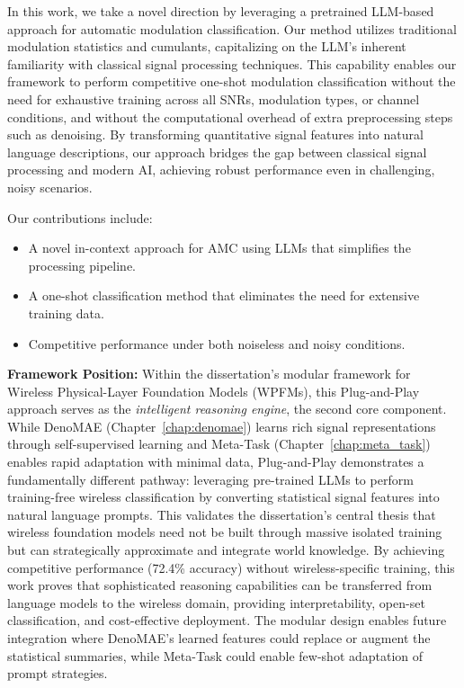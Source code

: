 In this work, we take a novel direction by leveraging a pretrained LLM-based approach for automatic modulation classification. Our method utilizes traditional modulation statistics and cumulants, capitalizing on the LLM’s inherent familiarity with classical signal processing techniques. This capability enables our framework to perform competitive one-shot modulation classification without the need for exhaustive training across all SNRs, modulation types, or channel conditions, and without the computational overhead of extra preprocessing steps such as denoising. By transforming quantitative signal features into natural language descriptions, our approach bridges the gap between classical signal processing and modern AI, achieving robust performance even in challenging, noisy scenarios.

Our contributions include:
\begin{itemize}
    \item A novel in-context approach for AMC using LLMs that simplifies the processing pipeline.
    \item A one-shot classification method that eliminates the need for extensive training data.
    \item Competitive performance under both noiseless and noisy conditions.
\end{itemize}

\textbf{Framework Position:} Within the dissertation's modular framework for Wireless Physical-Layer Foundation Models (WPFMs), this Plug-and-Play approach serves as the \textit{intelligent reasoning engine}, the second core component. While DenoMAE (Chapter~\ref{chap:denomae}) learns rich signal representations through self-supervised learning and Meta-Task (Chapter~\ref{chap:meta_task}) enables rapid adaptation with minimal data, Plug-and-Play demonstrates a fundamentally different pathway: leveraging pre-trained LLMs to perform training-free wireless classification by converting statistical signal features into natural language prompts. This validates the dissertation's central thesis that wireless foundation models need not be built through massive isolated training but can strategically approximate and integrate world knowledge. By achieving competitive performance (72.4\% accuracy) without wireless-specific training, this work proves that sophisticated reasoning capabilities can be transferred from language models to the wireless domain, providing interpretability, open-set classification, and cost-effective deployment. The modular design enables future integration where DenoMAE's learned features could replace or augment the statistical summaries, while Meta-Task could enable few-shot adaptation of prompt strategies.

